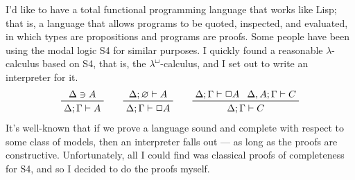 \documentclass{entcs}
\numberwithin{equation}{thm}
\newcommand{\lambdabox}{\lambda^{\mkern-1mu\sq\mkern-2mu}}
\renewcommand{\:}{\mathrel{:}}
\newcommand{\0}{\varnothing}
\newcommand{\sq}{\Box}
\renewcommand{\e}{\mathrel{\vdash}}
\begin{document}
I'd like to have a total functional programming language that works like Lisp; that is, a language that allows programs to be quoted, inspected, and evaluated, in which types are propositions and programs are proofs.  Some people have been using the modal logic S4 for similar purposes.  I quickly found a reasonable $\lambda$-calculus based on S4, that is, the $\lambdabox$-calculus, and I set out to write an interpreter for it.
\begin{gather*}
  \prftree{\Delta \ni A}{\Delta; \Gamma \e A}\qquad
  \prftree{\Delta; \0 \e A}{\Delta; \Gamma \e \sq A}\qquad
  \prftree{\Delta; \Gamma \e \sq A}{\Delta, A; \Gamma \e C}{\Delta; \Gamma \e C}
\end{gather*}
It's well-known that if we prove a language sound and complete with respect to some class of models, then an interpreter falls out --- as long as the proofs are constructive.  Unfortunately, all I could find was classical proofs of completeness for S4, and so I decided to do the proofs myself.
\end{document}
